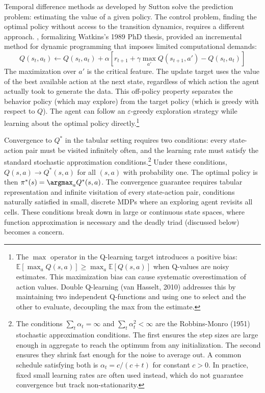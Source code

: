 Temporal difference methods as developed by Sutton solve the prediction problem: estimating the value of a given policy. The control problem, finding the optimal policy without access to the transition dynamics, requires a different approach. \citet{WatkinsDayan1992}, formalizing Watkins's 1989 PhD thesis, provided an incremental method for dynamic programming that imposes limited computational demands:
\begin{equation}
Q(s_t, a_t) \leftarrow Q(s_t, a_t) + \alpha \left[ r_{t+1} + \gamma \max_{a'} Q(s_{t+1}, a') - Q(s_t, a_t) \right]
\end{equation}
The maximization over $a'$ is the critical feature. The update target uses the value of the best available action at the next state, regardless of which action the agent actually took to generate the data. This off-policy property separates the behavior policy (which may explore) from the target policy (which is greedy with respect to $Q$). The agent can follow an $\varepsilon$-greedy exploration strategy while learning about the optimal policy directly.\footnote{The $\max$ operator in the Q-learning target introduces a positive bias: $\mathbb{E}[\max_a Q(s,a)] \geq \max_a \mathbb{E}[Q(s,a)]$ when Q-values are noisy estimates. This maximization bias can cause systematic overestimation of action values. Double Q-learning (van Hasselt, 2010) addresses this by maintaining two independent Q-functions and using one to select and the other to evaluate, decoupling the max from the estimate.}

Convergence to $Q^*$ in the tabular setting requires two conditions: every state-action pair must be visited infinitely often, and the learning rate must satisfy the standard stochastic approximation conditions.\footnote{The conditions $\sum_t \alpha_t = \infty$ and $\sum_t \alpha_t^2 < \infty$ are the Robbins-Monro (1951) stochastic approximation conditions. The first ensures the step sizes are large enough in aggregate to reach the optimum from any initialization. The second ensures they shrink fast enough for the noise to average out. A common schedule satisfying both is $\alpha_t = c / (c + t)$ for constant $c > 0$. In practice, fixed small learning rates are often used instead, which do not guarantee convergence but track non-stationarity.} Under these conditions, $Q(s,a) \to Q^*(s,a)$ for all $(s,a)$ with probability one. The optimal policy is then $\pi^*(s) = \argmax_a Q^*(s,a)$. The convergence guarantee requires tabular representation and infinite visitation of every state-action pair, conditions naturally satisfied in small, discrete MDPs where an exploring agent revisits all cells. These conditions break down in large or continuous state spaces, where function approximation is necessary and the deadly triad (discussed below) becomes a concern.

